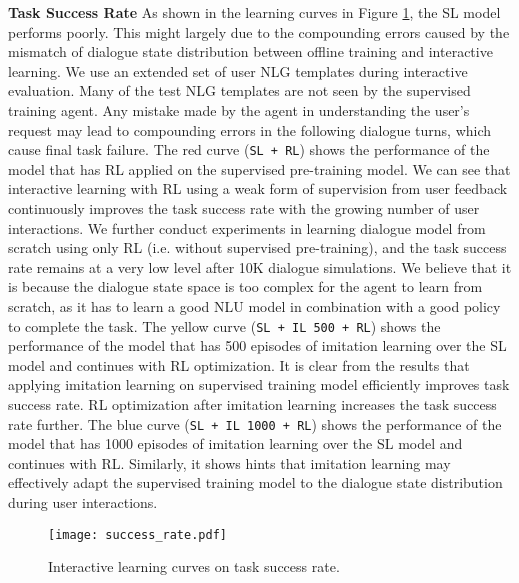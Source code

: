 \documentclass[11pt,a4paper]{article}
\begin{document}
    \textbf{Task Success Rate} \hspace{3mm} As shown in the learning curves in Figure \ref{fig:success_rate_curves}, the SL model performs poorly. This might largely due to the compounding errors caused by the mismatch of dialogue state distribution between offline training and interactive learning. We use an extended set of user NLG templates during interactive evaluation. Many of the test NLG templates are not seen by the supervised training agent. Any mistake made by the agent in understanding the user's request may lead to compounding errors in the following dialogue turns, which cause final task failure. The red curve ({\tt SL + RL}) shows the performance of the model that has RL applied on the supervised pre-training model. We can see that interactive learning with RL using a weak form of supervision from user feedback continuously improves the task success rate with the growing number of user interactions. We further conduct experiments in learning dialogue model from scratch using only RL (i.e. without supervised pre-training), and the task success rate remains at a very low level after 10K dialogue simulations. We believe that it is because the dialogue state space is too complex for the agent to learn from scratch, as it has to learn a good NLU model in combination with a good policy to complete the task. The yellow curve ({\tt SL + IL 500 + RL}) shows the performance of the model that has 500 episodes of imitation learning over the SL model and continues with RL optimization. It is clear from the results that applying imitation learning on supervised training model efficiently improves task success rate. RL optimization after imitation learning increases the task success rate further. The blue curve ({\tt SL + IL 1000 + RL}) shows the performance of the model that has 1000 episodes of imitation learning over the SL model and continues with RL. Similarly, it shows hints that imitation learning may effectively adapt the supervised training model to the dialogue state distribution during user interactions. 
    
        \begin{figure}[t]
          \centering
          \texttt{[image: success\_rate.pdf]}
          \vspace*{-4ex}
          \caption{Interactive learning curves on task success rate.}
          \label{fig:success_rate_curves}
        \end{figure}
 
\end{document}
